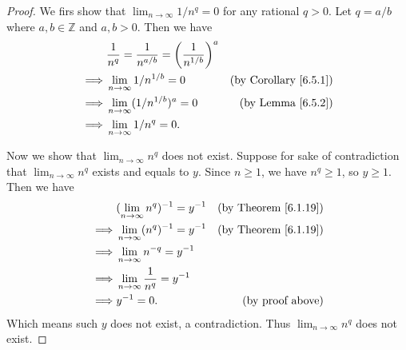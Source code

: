 \begin{proof}
We firs show that \(\lim_{n \to \infty} 1 / n^q = 0\) for any rational \(q > 0\).
Let \(q = a / b\) where \(a, b \in \mathds{Z}\) and \(a, b > 0\).
Then we have
\begin{align*}
& \frac{1}{n^q} = \frac{1}{n^{a / b}} = \bigg(\frac{1}{n^{1 / b}}\bigg)^a \\
\implies & \lim_{n \to \infty} 1 / n^{1 / b} = 0 & \text{(by Corollary \ref{6.5.1})} \\
\implies & \lim_{n \to \infty} (1 / n^{1 / b})^a = 0 & \text{(by Lemma \ref{6.5.2})} \\
\implies & \lim_{n \to \infty} 1 / n^q = 0.
\end{align*}

Now we show that \(\lim_{n \to \infty} n^q\) does not exist.
Suppose for sake of contradiction that \(\lim_{n \to \infty} n^q\) exists and equals to \(y\).
Since \(n \geq 1\), we have \(n^q \geq 1\), so \(y \geq 1\).
Then we have
\begin{align*}
& (\lim_{n \to \infty} n^q)^{-1} = y^{-1} & \text{(by Theorem \ref{6.1.19})} \\
\implies & \lim_{n \to \infty} (n^q)^{-1} = y^{-1} & \text{(by Theorem \ref{6.1.19})} \\
\implies & \lim_{n \to \infty} n^{-q} = y^{-1} \\
\implies & \lim_{n \to \infty} \frac{1}{n^q} = y^{-1} \\
\implies & y^{-1} = 0. & \text{(by proof above)}
\end{align*}
Which means such \(y\) does not exist, a contradiction.
Thus \(\lim_{n \to \infty} n^q\) does not exist.
\end{proof}